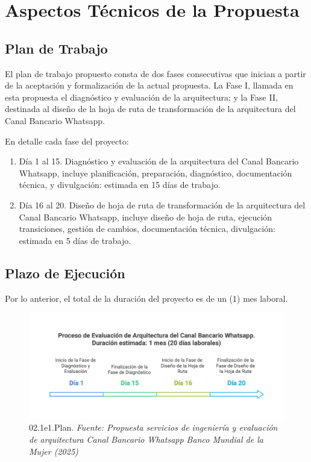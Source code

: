 \documentclass[
  paper=a4,
  ,captions=tableheading
]{scrartcl}
\renewenvironment{quote}{\begin{customblockquote}\list{}{\rightmargin=0em\leftmargin=0em}%
\item\relax\color{blockquote-text}\ignorespaces}{\unskip\unskip\endlist\end{customblockquote}}
\begin{document}
\newpage

\section{Aspectos Técnicos de la
Propuesta}\label{sec:aspectos-tuxe9cnicos-de-la-propuesta}

\subsection{Plan de Trabajo}\label{sec:plan-de-trabajo}

\begin{quote}
\end{quote}

El plan de trabajo propuesto consta de dos fases consecutivas que
inician a partir de la aceptación y formalización de la actual
propuesta. La Fase I, llamada en esta propuesta el diagnóstico y
evaluación de la arquitectura; y la Fase II, destinada al diseño de la
hoja de ruta de transformación de la arquitectura del Canal Bancario
Whatsapp.

En detalle cada fase del proyecto:

\begin{enumerate}
\def\labelenumi{\arabic{enumi}.}
\item
  Día 1 al 15. Diagnóstico y evaluación de la arquitectura del Canal
  Bancario Whatsapp, incluye planificación, preparación, diagnóstico,
  documentación técnica, y divulgación: estimada en 15 días de trabajo.
\item
  Día 16 al 20. Diseño de hoja de ruta de transformación de la
  arquitectura del Canal Bancario Whatsapp, incluye diseño de hoja de
  ruta, ejecución transiciones, gestión de cambios, documentación
  técnica, divulgación: estimada en 5 días de trabajo.
\end{enumerate}

\subsection{Plazo de Ejecución}\label{sec:plazo-de-ejecuciuxf3n}

Por lo anterior, el total de la duración del proyecto es de un (1) mes
laboral.

\begin{figure}
\centering
\includegraphics{images/02.1e1.Plan.png}
\caption{02.1e1.Plan. \emph{Fuente: Propuesta servicios de ingeniería y
evaluación de arquitectura Canal Bancario Whatsapp Banco Mundial de la
Mujer (2025)}}\label{fig:id-650dca2ba0114dca99ad6302b8ed6dc7}
\end{figure}
\end{document}
